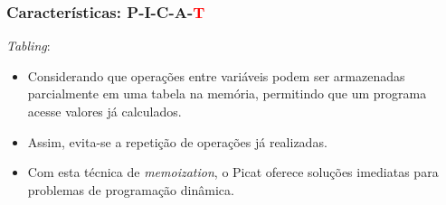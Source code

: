 \documentclass[10pt]{beamer}
\begin{document}

\begin{frame}
    \frametitle{Características: P-I-C-A-\textcolor{red}{T}}
    \textit{Tabling}:
    \begin{itemize}
      \item     Considerando que operações entre variáveis podem ser armazenadas parcialmente em uma tabela na memória, permitindo que um programa acesse valores já calculados.
	\item 	Assim, evita-se a repetição de operações já realizadas.
	\item 	Com esta técnica de \textit{memoization}, o Picat oferece soluções imediatas para problemas de programação dinâmica.
    \end{itemize}
\end{frame}

\end{document}
